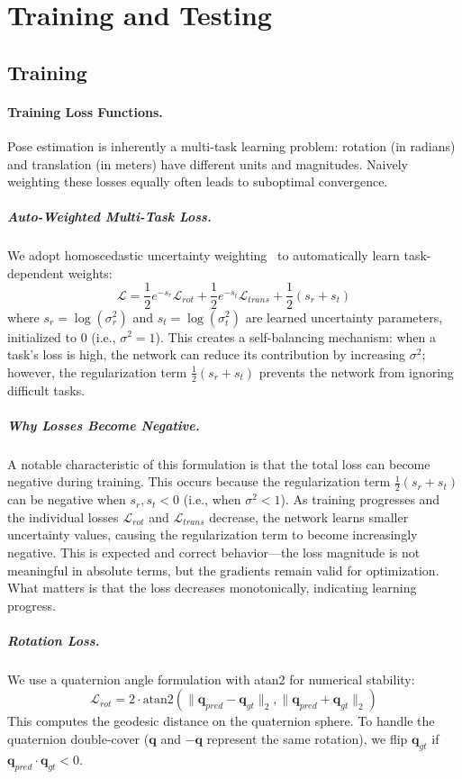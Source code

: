 \section{Training and Testing}
\label{sec:training_testing}

\subsection{Training}

\paragraph{Training Loss Functions.}

Pose estimation is inherently a multi-task learning problem: rotation (in radians) and translation (in meters) have different units and magnitudes. Naively weighting these losses equally often leads to suboptimal convergence.

\subparagraph{Auto-Weighted Multi-Task Loss.}
We adopt homoscedastic uncertainty weighting~\cite{kendall2018multi} to automatically learn task-dependent weights:
\begin{equation}
    \mathcal{L} = \frac{1}{2}e^{-s_r}\mathcal{L}_{rot} + \frac{1}{2}e^{-s_t}\mathcal{L}_{trans} + \frac{1}{2}(s_r + s_t)
\end{equation}
where $s_r = \log(\sigma^2_r)$ and $s_t = \log(\sigma^2_t)$ are learned uncertainty parameters, initialized to 0 (i.e., $\sigma^2 = 1$). This creates a self-balancing mechanism: when a task's loss is high, the network can reduce its contribution by increasing $\sigma^2$; however, the regularization term $\frac{1}{2}(s_r + s_t)$ prevents the network from ignoring difficult tasks.

\subparagraph{Why Losses Become Negative.}
A notable characteristic of this formulation is that the total loss can become negative during training. This occurs because the regularization term $\frac{1}{2}(s_r + s_t)$ can be negative when $s_r, s_t < 0$ (i.e., when $\sigma^2 < 1$). As training progresses and the individual losses $\mathcal{L}_{rot}$ and $\mathcal{L}_{trans}$ decrease, the network learns smaller uncertainty values, causing the regularization term to become increasingly negative. This is expected and correct behavior---the loss magnitude is not meaningful in absolute terms, but the gradients remain valid for optimization. What matters is that the loss decreases monotonically, indicating learning progress.

\subparagraph{Rotation Loss.}
We use a quaternion angle formulation with atan2 for numerical stability:
\begin{equation}
    \mathcal{L}_{rot} = 2 \cdot \text{atan2}(\|\mathbf{q}_{pred} - \mathbf{q}_{gt}\|_2, \|\mathbf{q}_{pred} + \mathbf{q}_{gt}\|_2)
\end{equation}
This computes the geodesic distance on the quaternion sphere. To handle the quaternion double-cover ($\mathbf{q}$ and $-\mathbf{q}$ represent the same rotation), we flip $\mathbf{q}_{gt}$ if $\mathbf{q}_{pred} \cdot \mathbf{q}_{gt} < 0$.

